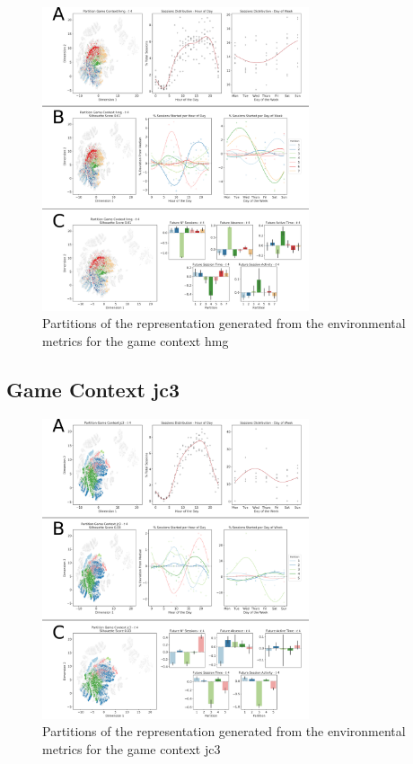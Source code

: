\begin{figure}[ht]
\includegraphics[width=0.7\textwidth]{images/appendix_D/clust_hmg_env.png}
\centering
\caption[Partitions of the representation generated from the environmental metrics for the game context hmg]{Partitions of the representation generated from the environmental metrics for the game context hmg}
\end{figure}
\FloatBarrier

\subsection{Game Context jc3}
\label{env_clust_jc3}

\begin{figure}[ht]
\includegraphics[width=0.7\textwidth]{images/appendix_D/clust_env_jc3.png}
\centering
\caption[Partitions of the representation generated from the environmental metrics for the game context jc3]{Partitions of the representation generated from the environmental metrics for the game context jc3}
\end{figure}
\FloatBarrier

